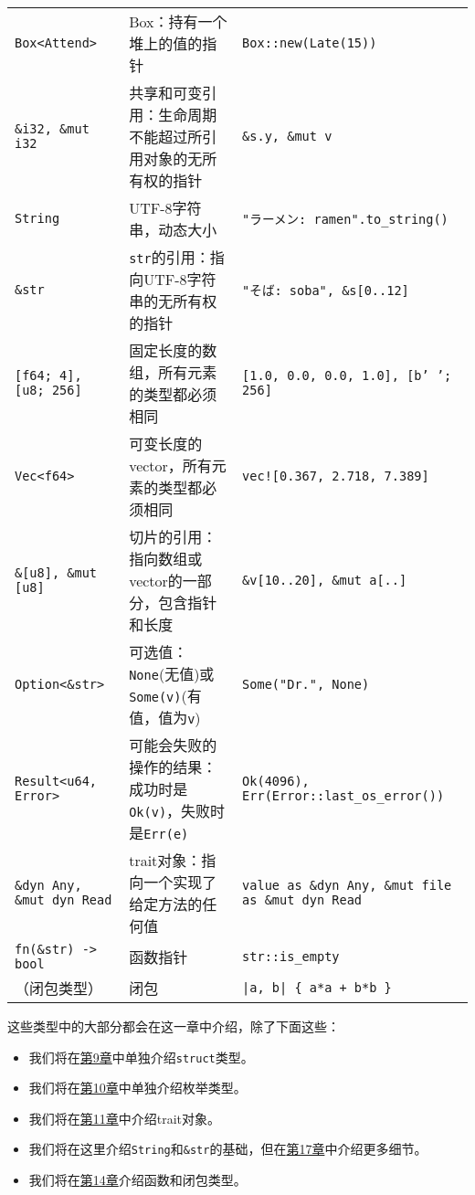 \begin{longtable}{p{}p{}p{}}
    \texttt{Box<Attend>}                             & Box：持有一个堆上的值的指针   & \texttt{Box::new(Late(15))} \\
    \texttt{\&i32, \&mut i32}                       & 共享和可变引用：生命周期不能超过所引用对象的无所有权的指针 & \texttt{\&s.y, \&mut v} \\
    \rowcolor{tablecolor}
    \texttt{String}                                 & UTF-8字符串，动态大小         & \texttt{"ラーメン: ramen"\newline.to\_string()} \\
    \texttt{\&str}                                  & \texttt{str}的引用：指向UTF-8字符串的无所有权的指针 & \texttt{"そば: soba", \&s[0..12]} \\
    \rowcolor{tablecolor}
    \texttt{[f64; 4], [u8; 256]}                    & 固定长度的数组，所有元素的类型都必须相同   & \texttt{[1.0, 0.0, 0.0, 1.0], [b' '; 256]} \\
    \texttt{Vec<f64>}                               & 可变长度的vector，所有元素的类型都必须相同 & \texttt{vec![0.367, 2.718, 7.389]} \\
    \rowcolor{tablecolor}
    \texttt{\&[u8], \&mut [u8]}                     & 切片的引用：指向数组或vector的一部分，包含指针和长度 & \texttt{\&v[10..20], \&mut a[..]} \\
    \texttt{Option<\&str>}      & 可选值：\texttt{None}(无值)或\texttt{Some(v)}(有值，值为\texttt{v})   & \texttt{Some("Dr.", None)} \\
    \rowcolor{tablecolor}
    \texttt{Result<u64, Error>} & 可能会失败的操作的结果：成功时是\texttt{Ok(v)}，失败时是\texttt{Err(e)} & \texttt{Ok(4096), Err(Error::last\_os\_error())} \\
    \texttt{\&dyn Any, \&mut dyn Read}  & trait对象：指向一个实现了给定方法的任何值 & \texttt{value as \&dyn Any, \&mut file as \&mut dyn Read} \\
    \rowcolor{tablecolor}
    \texttt{fn(\&str) -> bool}          & 函数指针      & \texttt{str::is\_empty}           \\
    （闭包类型）                         & 闭包         & \texttt{|a, b| \{ a*a + b*b \}}    \\
\end{longtable}

这些类型中的大部分都会在这一章中介绍，除了下面这些：
\begin{itemize}
    \item 我们将在\hyperref[ch09]{第9章}中单独介绍\texttt{struct}类型。
    \item 我们将在\hyperref[ch10]{第10章}中单独介绍枚举类型。
    \item 我们将在\hyperref[ch11]{第11章}中介绍trait对象。
    \item 我们将在这里介绍\texttt{String}和\texttt{\&str}的基础，但在\hyperref[ch17]{第17章}中介绍更多细节。
    \item 我们将在\hyperref[ch14]{第14章}介绍函数和闭包类型。
\end{itemize}

